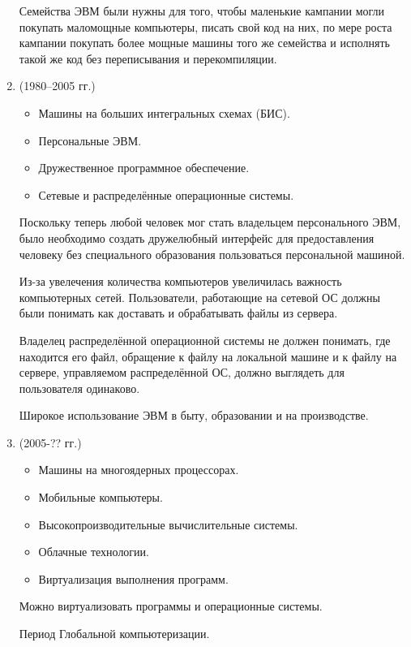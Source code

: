 \documentclass[12pt, a4paper]{article}
\begin{document}
\begin{enumerate}
         Семейства ЭВМ были нужны для того, чтобы маленькие кампании могли покупать маломощные компьютеры, 
        писать свой код на них, по мере роста кампании покупать более мощные машины того же семейства и исполнять 
        такой же код без переписывания и перекомпиляции.
        \item[\text{4-й период}] (1980--2005 гг.)
        \begin{itemize}
            \item Машины на больших интегральных схемах (БИС).
            \item Персональные ЭВМ.
            \item Дружественное программное обеспечение.
            \item Сетевые и распределённые операционные системы.
        \end{itemize}
         Поскольку теперь любой человек мог стать владельцем персонального ЭВМ, 
        было необходимо создать дружелюбный интерфейс для предоставления человеку без 
        специального образования пользоваться персональной машиной.\par
         Из-за увелечения количества компьютеров увеличилась важность компьютерных 
        сетей. Пользователи, работающие на сетевой ОС должны были понимать как доставать 
        и обрабатывать файлы из сервера.\par
         Владелец распределённой операционной системы не 
        должен понимать, где находится его файл, обращение к файлу на локальной машине 
        и к файлу на сервере, управляемом распределённой ОС, должно выглядеть для пользователя 
        одинаково.\par
         Широкое использование ЭВМ в быту, образовании и на производстве.
        \item[\text{5-й период}] (2005-?? гг.)
        \begin{itemize}
            \item Машины на многоядерных процессорах.
            \item Мобильные компьютеры.
            \item Высокопроизводительные вычислительные системы.
            \item Облачные технологии.
            \item Виртуализация выполнения программ.
        \end{itemize}
         Можно виртуализовать программы и операционные системы.\par
         Период Глобальной компьютеризации.
    \end{enumerate}
\end{document}
